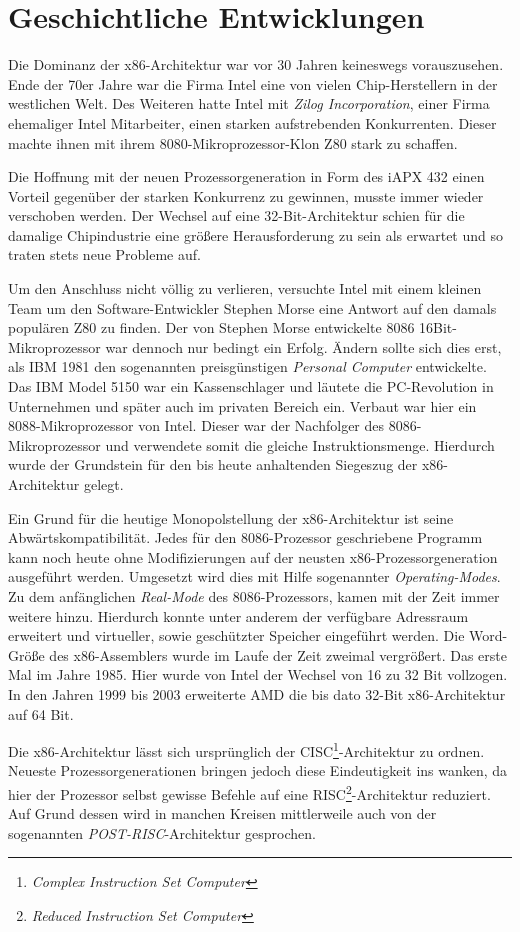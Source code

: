 \section{Geschichtliche Entwicklungen}

Die Dominanz der x86-Architektur war vor 30 Jahren keineswegs vorauszusehen.
Ende der 70er Jahre war die Firma Intel eine von vielen Chip-Herstellern in der westlichen Welt.
Des Weiteren hatte Intel mit \emph{Zilog Incorporation}, einer Firma ehemaliger Intel Mitarbeiter, einen starken aufstrebenden Konkurrenten.
Dieser machte ihnen mit ihrem 8080-Mikroprozessor-Klon Z80 stark zu schaffen.

Die Hoffnung mit der neuen Prozessorgeneration in Form des iAPX 432 einen Vorteil gegenüber der starken Konkurrenz zu gewinnen, musste immer wieder verschoben werden.
Der Wechsel auf eine 32-Bit-Architektur schien für die damalige Chipindustrie eine größere Herausforderung zu sein als erwartet und so traten stets neue Probleme auf.

Um den Anschluss nicht völlig zu verlieren, versuchte Intel mit einem kleinen Team um den Software-Entwickler Stephen Morse eine Antwort auf den damals populären Z80 zu finden.
Der von Stephen Morse entwickelte 8086 16Bit-Mikroprozessor war dennoch nur bedingt ein Erfolg.
Ändern sollte sich dies erst, als IBM 1981 den sogenannten preisgünstigen \textit{Personal Computer} entwickelte. Das IBM Model 5150 war ein Kassenschlager und läutete die PC-Revolution in Unternehmen und später auch im privaten Bereich ein.
Verbaut war hier ein 8088-Mikroprozessor von Intel. Dieser war der Nachfolger des 8086-Mikroprozessor und verwendete somit die gleiche Instruktionsmenge.
Hierdurch wurde der Grundstein für den bis heute anhaltenden Siegeszug der x86-Architektur gelegt.\cite{pcworld}

Ein Grund für die heutige Monopolstellung der x86-Architektur ist seine Abwärtskompatibilität.
Jedes für den 8086-Prozessor geschriebene Programm kann noch heute ohne Modifizierungen auf der neusten x86-Prozessorgeneration ausgeführt werden.
Umgesetzt wird dies mit Hilfe sogenannter \textit{Operating-Modes}. Zu dem anfänglichen \textit{Real-Mode} des 8086-Prozessors, kamen mit der Zeit immer weitere hinzu.
Hierdurch konnte unter anderem der verfügbare Adressraum erweitert und virtueller, sowie geschützter Speicher eingeführt werden.
Die Word-Größe des x86-Assemblers wurde im Laufe der Zeit zweimal vergrößert. Das erste Mal im Jahre 1985. Hier wurde von Intel der Wechsel von 16 zu 32 Bit vollzogen. In den Jahren 1999 bis 2003 erweiterte AMD die bis dato 32-Bit x86-Architektur auf 64 Bit.

Die x86-Architektur lässt sich ursprünglich der CISC\footnote{\textit{Complex Instruction Set Computer}}-Architektur zu ordnen.
Neueste Prozessorgenerationen bringen jedoch diese Eindeutigkeit ins wanken, da hier der Prozessor selbst gewisse Befehle auf eine RISC\footnote{\textit{Reduced Instruction Set Computer}}-Architektur  reduziert.
Auf Grund dessen wird in manchen Kreisen mittlerweile auch von der sogenannten \textit{POST-RISC}-Architektur gesprochen. \cite{postrisc}
